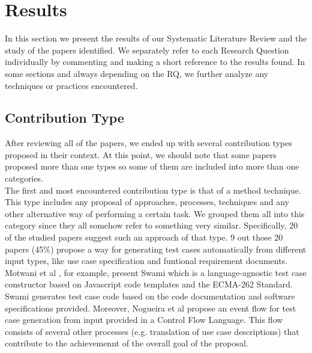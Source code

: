 \chapter{Results}

In this section we present the results of our Systematic Literature Review and the study of the papers identified. We separately refer to 
each Research Question individually by commenting and making a short reference to the results found. In some sections and always depending on the RQ, we further analyze any 
techniques or practices encountered.

\section {Contribution Type}
After reviewing all of the papers, we ended up with several contribution types proposed in their context. At this point, we should note that some papers 
proposed more than one types so some of them are included into more than one categories. \\

The first and most encountered contribution type is that of a method technique. This type includes any proposal of approaches, processes, techniques and any 
other alternative way of performing a certain task. We grouped them all into this category since they all somehow refer to something very similar. Specifically, 20 of the
studied papers suggest such an approach of that type. 9 out those 20 papers (45\%) propose a way for generating test cases automatically from different input types, like 
use case specification and funtional requirement documents. Motwani et al \cite{8812070}, for example, present Swami which is a language-agnostic test case constructor 
based on Javascript code templates and the ECMA-262 Standard. Swami generates test case code based on the code documentation and software specifications provided. Moreover, 
Nogueira et al \cite{nogueira2015automatic} propose an event flow for test case generation from input provided in a Control Flow Language. This flow consists of several other 
processes (e.g. translation of use case descriptions) that contribute to the achievemennt of the overall goal of the proposal. \\

